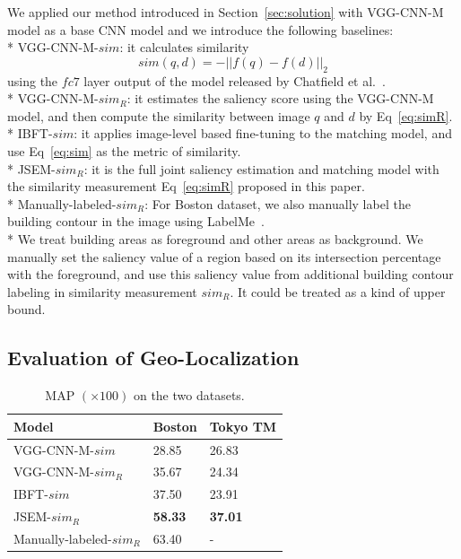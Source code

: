 We applied our method introduced in Section~\ref{sec:solution} with VGG-CNN-M model as a base CNN model and we introduce the following baselines: \\*
VGG-CNN-M-$sim$: it calculates similarity 
\begin{equation}
sim(q, d) =  -||f(q) - f(d)||_2
\label{eq:sim}
\end{equation}
using the $fc7$ layer output of the model released by Chatfield et al.~\cite{chatfield2014return}. \\*
VGG-CNN-M-$sim_R$: it estimates the saliency score using the VGG-CNN-M model, and then compute the similarity between image $q$ and $d$ by Eq~\eqref{eq:simR}. \\*
IBFT-$sim$: it applies image-level based fine-tuning to the matching model, and use Eq~\eqref{eq:sim} as the metric of similarity.\\*
JSEM-$sim_R$: it is the full joint saliency estimation and matching model with the similarity measurement Eq~\eqref{eq:simR} proposed in this paper. \\*
Manually-labeled-$sim_R$: For Boston dataset, we also manually label the building contour in the image using LabelMe~\cite{Russell2008}. \\*
We treat building areas as foreground and other areas as background. 
We manually set the saliency value of a region based on its intersection percentage with the foreground, and use this saliency value from additional building contour labeling in similarity measurement $sim_R$. It could be treated as a kind of upper bound. 


\subsection{Evaluation of Geo-Localization}
\begin{table}[htbp]
\begin{tabular}{|l|l|l|}
\hline
Model & Boston & Tokyo TM\\
\hline \hline
VGG-CNN-M-$sim$ & 28.85 & 26.83\\
VGG-CNN-M-$sim_R$ & 35.67 & 24.34\\
IBFT-$sim$ & 37.50 & 23.91\\
JSEM-$sim_R$ & \textbf{58.33} & \textbf{37.01}\\
Manually-labeled-$sim_R$ & 63.40 & -\\
\hline
\end{tabular}
\caption{MAP $(\times 100)$ on the two datasets.}
\label{table:map}
\end{table}

